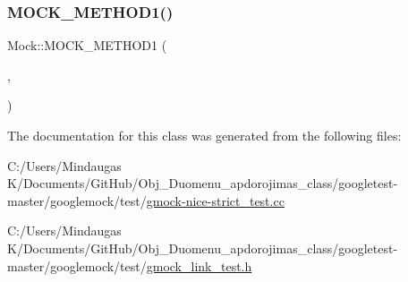\mbox{\label{class_mock_a50e2bda4375a59bb89fd5652bd33eb0f}} 
\subsubsection{\texorpdfstring{MOCK\_METHOD1()}{MOCK\_METHOD1()}\hspace{0.1cm}{\footnotesize\ttfamily [27/27]}}
{\footnotesize\ttfamily Mock\+::\+M\+O\+C\+K\+\_\+\+M\+E\+T\+H\+O\+D1 (\begin{DoxyParamCaption}\item[{\mbox{\hyperlink{class_interface_ae84fe7e53f881db2f823ad35d004927a}{Void\+From\+Vector}}}]{,  }\item[{void(const std\+::vector$<$ int $>$ \&\mbox{\hyperlink{_important_values_8h_aaad811047eb9ea3edb6ec2bbeddb2b2b}{v}})}]{ }\end{DoxyParamCaption})}



The documentation for this class was generated from the following files\+:\begin{DoxyCompactItemize}
\item 
C\+:/\+Users/\+Mindaugas K/\+Documents/\+Git\+Hub/\+Obj\+\_\+\+Duomenu\+\_\+apdorojimas\+\_\+class/googletest-\/master/googlemock/test/\mbox{\hyperlink{googletest-master_2googlemock_2test_2gmock-nice-strict__test_8cc}{gmock-\/nice-\/strict\+\_\+test.\+cc}}\item 
C\+:/\+Users/\+Mindaugas K/\+Documents/\+Git\+Hub/\+Obj\+\_\+\+Duomenu\+\_\+apdorojimas\+\_\+class/googletest-\/master/googlemock/test/\mbox{\hyperlink{googletest-master_2googlemock_2test_2gmock__link__test_8h}{gmock\+\_\+link\+\_\+test.\+h}}\end{DoxyCompactItemize}
